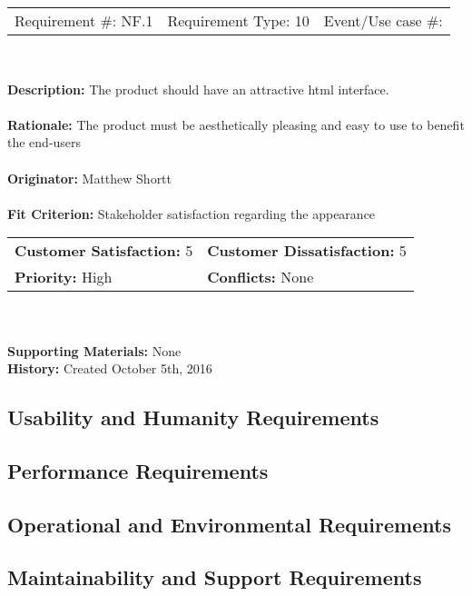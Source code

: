 \documentclass[12pt, titlepage]{article}
\begin{document}
\begin{framed}

	\begin{center}
		
		\begin{tabular}{ l c r }
			Requirement \#: NF.1 & Requirement Type: 10 & Event/Use case \#: \\
		\end{tabular} \\
	\end{center}
	\textbf{Description:} The product should have an attractive html interface. \\
	\\
	\textbf{Rationale:} The product must be aesthetically pleasing and easy to 
	use to benefit the end-users \\
	\\
	\textbf{Originator:} Matthew Shortt \\
	\\
	\textbf{Fit Criterion:} Stakeholder satisfaction regarding the appearance  \\

	\begin{tabular}{ll}
		\textbf{Customer Satisfaction:} 5 & \textbf{Customer Dissatisfaction:} 5 \\
		\textbf{Priority:} High & \textbf{Conflicts:} None\\
	\end{tabular} \\
	\\
	\textbf{Supporting Materials:} None \\
	\textbf{History:} Created October 5th, 2016

\end{framed}


\subsection{Usability and Humanity Requirements}

\subsection{Performance Requirements}

\subsection{Operational and Environmental Requirements}

\subsection{Maintainability and Support Requirements}
\end{document}
